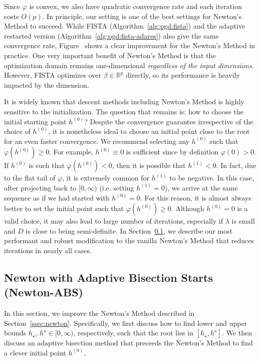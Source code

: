 \documentclass[fontsize=11pt]{article}
\newcommand{\R}{\mathbb{R}}
\newcommand{\todojames}[1]{\todo[linecolor=blue, backgroundcolor=blue!25, bordercolor=blue]{James: #1}}
\begin{document}
Since $\varphi$ is convex, we also have quadratic convergence rate and each iteration costs $O(p)$.
In principle, our setting is one of the best settings for Newton's Method to succeed.
While FISTA (Algorithm~\ref{alg:pgd:fista}) and the adaptive restarted version
(Algorithm~\ref{alg:pgd:fista-adares}) also give the same convergence rate,
Figure~\todojames{add figure ref} 
shows a clear improvement for the Newton's Method in practice.
One very important benefit of Newton's Method is that the optimization domain
remains one-dimensional \emph{regardless of the input dimensions}.
However, FISTA optimizes over $\beta \in \R^p$ directly, so its performance is heavily
impacted by the dimension.

It is widely known that descent methods including Newton's Method
is highly sensitive to the initialization.
The question that remains is: how to choose the initial starting point $h^{(0)}$?
Despite the convergence guarantee irrespective of the choice of $h^{(0)}$,
it is nonetheless ideal to choose an initial point close to the root for an even faster convergence.
We recommend selecting any $h^{(0)}$ such that $\varphi(h^{(0)}) \geq 0$.
For example, $h^{(0)} \equiv 0$ is sufficient since by definition $\varphi(0) > 0$.
If $h^{(0)}$ is such that $\varphi(h^{(0)}) < 0$,
then it is possible that $h^{(1)} < 0$.
In fact, due to the flat tail of $\varphi$, it is extremely common for $h^{(1)}$ to be negative.
In this case, after projecting back to $[0, \infty)$ (i.e. setting $h^{(1)} = 0$),
we arrive at the same sequence as if we had started with $h^{(0)} = 0$.
For this reason, it is almost always better to 
set the initial point such that $\varphi(h^{(0)}) \geq 0$.
Although $h^{(0)} = 0$ is a valid choice, it may also lead to large number of iterations,
especially if $\lambda$ is small and $D$ is close to being semi-definite.
In Section~\ref{ssec:nmab}, we describe our most performant and robust 
modification to the vanilla Newton's Method that reduces iterations in nearly all cases.

\subsection{Newton with Adaptive Bisection Starts (Newton-ABS)}\label{ssec:nmab}

In this section, we improve the Newton's Method described in Section~\ref{ssec:newton}.
Specifically, we first discuss how to find lower and upper bounds $h_\star$, $h^\star \in [0,\infty)$,
respectively, such that the root lies in $[h_\star, h^\star]$.
We then discuss an adaptive bisection method that preceeds the Newton's Method
to find a clever initial point $h^{(0)}$.
\end{document}
